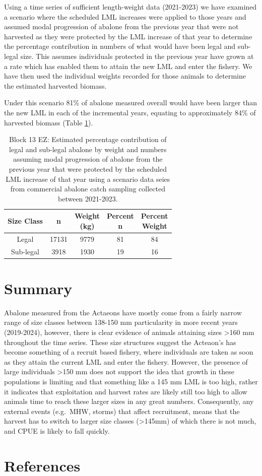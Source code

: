 \documentclass[
]{article}
\begin{document}
Using a time series of sufficient length-weight data (2021-2023) we have examined a scenario where the scheduled LML increases were applied to those years and assumed modal progression of abalone from the previous year that were not harvested as they were protected by the LML increase of that year to determine the percentage contribution in numbers of what would have been legal and sub-legal size. This assumes individuals protected in the previous year have grown at a rate which has enabled them to attain the new LML and enter the fishery. We have then used the individual weights recorded for those animals to determine the estimated harvested biomass.

Under this scenario 81\% of abalone measured overall would have been larger than the new LML in each of the incremental years, equating to approximately 84\% of harvested biomass (Table \ref{tab:modalprogress}).

\begin{table}

\caption{\label{tab:modalprogress}Block 13 EZ: Estimated percentage contribution of legal and sub-legal abalone by weight and numbers assuming modal progression of abalone from the previous year that were protected by the scheduled LML increase of that year using a scenario data seies from commercial abalone catch sampling collected between 2021-2023.}
\centering
\begin{tabular}[t]{ccccc}
\toprule
Size Class & n & \makecell[c]{Weight\\(kg)} & \makecell[c]{Percent\\n} & \makecell[c]{Percent\\Weight}\\
\midrule
Legal & 17131 & 9779 & 81 & 84\\
Sub-legal & 3918 & 1930 & 19 & 16\\
\bottomrule
\end{tabular}
\end{table}

\section{Summary}\label{summary}

Abalone measured from the Actaeons have mostly come from a fairly narrow range of size classes between 138-150 mm particularity in more recent years (2019-2024), however, there is clear evidence of animals attaining sizes \textgreater160 mm throughout the time series. These size structures suggest the Acteaon's has become something of a recruit based fishery, where individuals are taken as soon as they attain the current LML and enter the fishery. However, the presence of large individuals \textgreater150 mm does not support the idea that growth in these populations is limiting and that something like a 145 mm LML is too high, rather it indicates that exploitation and harvest rates are likely still too high to allow animals time to reach these larger sizes in any great numbers. Consequently, any external events (e.g.~MHW, storms) that affect recruitment, means that the harvest has to switch to larger size classes (\textgreater145mm) of which there is not much, and CPUE is likely to fall quickly.

\section{References}\label{references}
\end{document}
